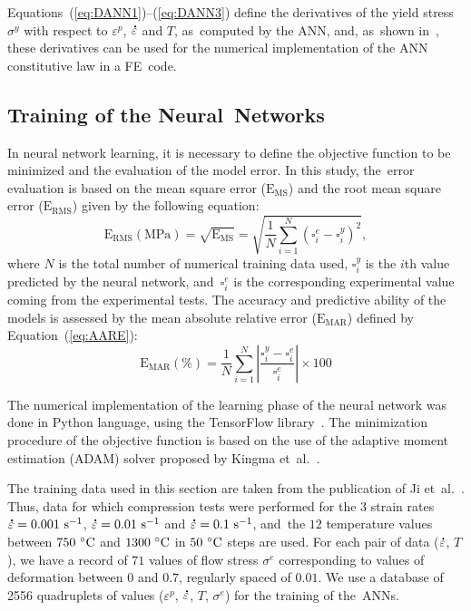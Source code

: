 \documentclass[algorithms,article,accept,pdftex,moreauthors]{Definitions/mdpi}
\DeclareRobustCommand{\mdot}[1]{\accentset{\mbox{\bfseries .}}{#1}}
\DeclareRobustCommand{\MSE}{\text{E}_\text{MS}}
\DeclareRobustCommand{\RMSE}{\text{E}_\text{RMS}}
\DeclareRobustCommand{\MARE}{\text{E}_\text{MAR}}
\DeclareRobustCommand{\ps}{\text{s}^{-1}}
\DeclareRobustCommand{\MPa}{\text{MPa}}
\begin{document}
Equations~(\ref{eq:DANN1})--(\ref{eq:DANN3}) define the derivatives of the yield stress $\sigma^y$ with respect to $\varepsilon^p$, $\mdot\varepsilon$ and $T$, as~computed by the ANN, and, as~shown in~\cite{Pantale-2021}, these derivatives can be used for the numerical implementation of the ANN constitutive law in a FE~code.

\subsection{Training of the Neural~Networks}\label{sec:ANN-traning}

In neural network learning, it is necessary to define the objective function to be minimized and the evaluation of the model error.
In this study, the~error evaluation is based on the mean square error ($\MSE$) and the root mean square error ($\RMSE$) given by the following equation:
\begin{equation}
\RMSE (\MPa) = \sqrt{\MSE} = \sqrt{\frac{1}{N} \sum_{i=1}^{N} \left(\square_i^e - \square_i^y\right)^2}, \label{eq:RMSE}
\end{equation}
where $N$ is the total number of numerical training data used, $\square_i^y$ is the $i$th value predicted by the neural network, and~$\square_i^e$ is the corresponding experimental value coming from the experimental tests.
The accuracy and predictive ability of the models is assessed by the mean absolute relative error ($\MARE$) defined by Equation~(\ref{eq:AARE}):
\begin{equation}
\MARE(\%) = \frac{1}{N} \sum_{i=1}^{N}{\left|\frac{\square_i^y -\square_i^e}{\square_i^e}\right|} \times 100 \label{eq:AARE}
\end{equation}

The numerical implementation of the learning phase of the neural network was done in Python language, using the TensorFlow library~\cite{Abadi-2016, Mattmann-2020}.
The minimization procedure of the objective function is based on the use of the adaptive moment estimation (ADAM) solver proposed by Kingma et~al.~\cite{Kingma-2015}.

The training data used in this section are taken from the publication of Ji et~al.~\cite{Ji-2018}.
Thus, data for which compression tests were performed for the $3$ strain rates $\mdot\varepsilon=0.001~\ps$, $\mdot\varepsilon=0.01~\ps$ and $\mdot\varepsilon=0.1~\ps$, and~the $12$ temperature values between $750~\celsius$ and $1300~\celsius$ in $50~\celsius$ steps are used.
For each pair of data ($\mdot\varepsilon$, $T$), we have a record of $71$ values of flow stress $\sigma^e$ corresponding to values of deformation between $0$ and $0.7$, regularly spaced of $0.01$.
We use a database of 2556 quadruplets of values ($\varepsilon^p$, $\mdot\varepsilon$, $T$, $\sigma^e$) for the training of the~ANNs.
\end{document}
